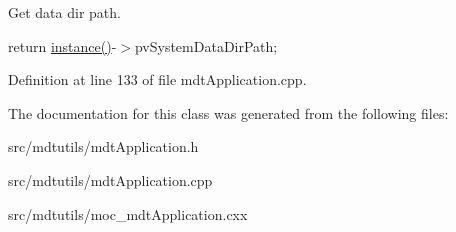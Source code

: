 Get data dir path. 



return \hyperlink{classmdt_application_a365ac79934070b0e5a42d2c7cd9b076d}{instance()}-\/$>$pvSystemDataDirPath; 



Definition at line 133 of file mdtApplication.cpp.



The documentation for this class was generated from the following files:\begin{DoxyCompactItemize}
\item 
src/mdtutils/mdtApplication.h\item 
src/mdtutils/mdtApplication.cpp\item 
src/mdtutils/moc\_\-mdtApplication.cxx\end{DoxyCompactItemize}
